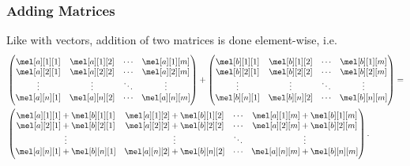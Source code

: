 \begin{frame}
  \frametitle{Adding Matrices}
  Like with vectors, addition of two matrices is done element-wise, i.e.
  \begin{align*}
    &\begin{pmatrix}
      \mel[a][1][1] & \mel[a][1][2] & \cdots & \mel[a][1][m]\\
      \mel[a][2][1] & \mel[a][2][2] & \cdots & \mel[a][2][m]\\
      \vdots & \vdots & \ddots & \vdots\\
      \mel[a][n][1] & \mel[a][n][2] & \cdots & \mel[a][n][m]
    \end{pmatrix} + 
    \begin{pmatrix}
      \mel[b][1][1] & \mel[b][1][2] & \cdots & \mel[b][1][m]\\
      \mel[b][2][1] & \mel[b][2][2] & \cdots & \mel[b][2][m]\\
      \vdots & \vdots & \ddots & \vdots\\
      \mel[b][n][1] & \mel[b][n][2] & \cdots & \mel[b][n][m]
    \end{pmatrix} =\\
    &\begin{pmatrix}
      \mel[a][1][1] + \mel[b][1][1] & \mel[a][1][2] + \mel[b][1][2] & \cdots & \mel[a][1][m] + \mel[b][1][m]\\
      \mel[a][2][1] + \mel[b][2][1] & \mel[a][2][2] + \mel[b][2][2] & \cdots & \mel[a][2][m] + \mel[b][2][m]\\
      \vdots & \vdots & \ddots & \vdots\\
      \mel[a][n][1] + \mel[b][n][1] & \mel[a][n][2] + \mel[b][n][2] & \cdots & \mel[a][n][m] + \mel[b][n][m]
    \end{pmatrix}.
  \end{align*}
\end{frame}

